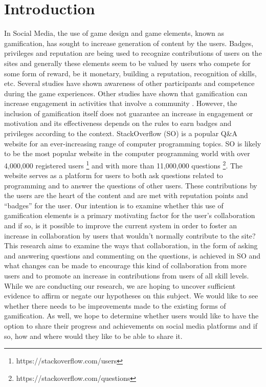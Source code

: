 \documentclass{sigchi}
\begin{document}

 

\section{Introduction}
In Social Media, the use of game design and game elements, known as gamification, has sought to increase generation of content by the users. Badges, privileges and reputation are being used to recognize contributions of users on the sites and generally these elements seem to be valued by users who compete for some form of reward, be it monetary, building a reputation, recognition of skills, etc. Several studies have shown awareness of other participants and competence during the game experiences\cite{Rughinis}. Other studies have shown that gamification can increase engagement in activities that involve a community \cite{Marder}. However, the inclusion of gamification itself does not guarantee an increase in engagement or motivation and its effectiveness depends on the rules to earn badges and privileges  according to the context\cite{Deterding}.
StackOverflow (SO) is a popular Q\&A website for an ever-increasing range of computer programming topics. SO is likely to be the most popular website in the computer programming world with over 4,000,000 registered users \footnote{https://stackoverflow.com/users} and with more than 11,000,000 questions \footnote{https://stackoverflow.com/questions}. The website serves as a platform for users to both ask questions related to programming and to answer the questions of other users. These contributions by the users are the heart of the content and are met with reputation points and “badges” for the user. Our intention is to examine whether this use of gamification elements is a primary motivating factor for the user’s collaboration and if so, is it possible to improve the current system in order to foster an increase in collaboration by users that wouldn’t normally contribute to the site? 
This research aims to examine the ways that collaboration, in the form of asking and answering questions and commenting on the questions, is achieved in SO and what changes can be made to encourage this kind of collaboration from more users and to promote an increase in contributions from users of all skill levels. 
While we are conducting our research, we are hoping to uncover sufficient evidence to affirm or negate our hypotheses on this subject. We would like to see whether there needs to be improvements made to the existing forms of gamification. As well, we hope to determine whether users would like to have the option to share their progress and achievements on social media platforms and if so, how and where would they like to be able to share it.
\end{document}
